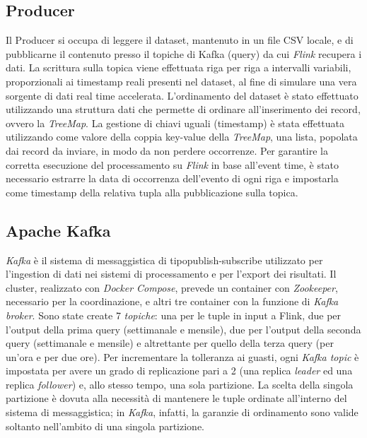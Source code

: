 \documentclass[conference]{IEEEtran}
\begin{document}
\subsection*{\textbf{Producer}}
Il Producer si occupa di leggere il ​dataset, mantenuto in un
file CSV locale, e di pubblicarne il contenuto presso il
topiche di Kafka (query) da cui \emph{Flink} recupera i dati. La scrittura sulla
topica viene effettuata riga per riga a intervalli variabili, proporzionali ai timestamp reali presenti nel dataset, al fine di simulare una
vera sorgente di dati ​real time ​accelerata. L'ordinamento del dataset \`{e} stato effettuato utilizzando una struttura dati che permette di ordinare all'inserimento dei record, ovvero la \emph{TreeMap}. La gestione di chiavi uguali (timestamp) \`{e} stata effettuata utilizzando come valore della coppia key-value della \emph{TreeMap}, una lista, popolata dai record da inviare, in modo da non perdere occorrenze.
Per garantire la corretta esecuzione del processamento su
\emph{Flink} in base all'​ event time,​ \`{e} stato necessario
estrarre la data di occorrenza dell'evento di ogni riga e
impostarla come ​timestamp della relativa tupla alla
pubblicazione sulla topica. 

\subsection*{\textbf{Apache Kafka}}
\emph{Kafka} è il sistema di messaggistica di tipo ​publish-subscribe
utilizzato per l'ingestion di dati nei sistemi di processamento
e per l'export dei risultati. Il ​cluster, realizzato con \emph{Docker
Compose}, prevede un​ container con \emph{Zookeeper}, necessario
per la coordinazione, e altri tre​ container con la funzione di
\emph{Kafka broker}. Sono state create 7 \emph{topiche}: una per le tuple
in input a Flink, due per l'output della prima query (settimanale e
mensile), due per l'output della seconda ​query (settimanale e mensile) e altrettante per quello della terza query (per un'ora e per due ore). Per incrementare la tolleranza ai guasti, ogni \emph{Kafka ​topic} è impostata per avere un grado di replicazione pari a 2 (una replica \emph{​leader} ed una replica
\emph{follower}) e, allo stesso tempo, una sola partizione. La scelta
della singola partizione è dovuta alla necessità di
mantenere le tuple ordinate all’interno del sistema di
messaggistica; in \emph{Kafka}, infatti, la garanzie di ordinamento
sono valide soltanto nell’ambito di una singola partizione.
\end{document}
